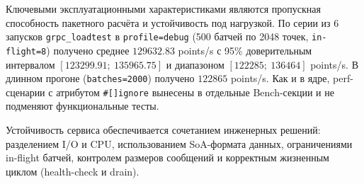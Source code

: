 Ключевыми эксплуатационными характеристиками являются
пропускная способность пакетного расчёта и устойчивость под нагрузкой.  
По серии из 6 запусков \texttt{grpc\_loadtest}
в \texttt{profile=debug}
(500 батчей по 2048 точек, \texttt{in-flight=8})
получено среднее $129632.83$ points/s
с 95\% доверительным интервалом
$[123299.91;\ 135965.75]$ и диапазоном
$[122285;\ 136464]$ points/s.
В длинном прогоне (\texttt{batches=2000})
получено $122865$ points/s.
Как и в ядре, perf-сценарии
с атрибутом \texttt{\#[]ignore}
вынесены в отдельные Bench-секции
и не подменяют функциональные тесты.

Устойчивость сервиса обеспечивается сочетанием инженерных решений:
разделением I/O и CPU, использованием SoA-формата данных, ограничениями in-flight батчей, контролем размеров сообщений и корректным жизненным циклом (health-check и drain).  
